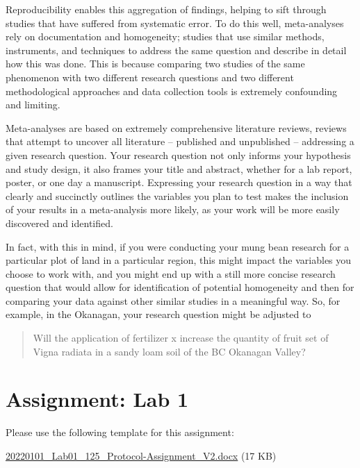 \documentclass[
]{book}
\begin{document}
Reproducibility enables this aggregation of findings, helping to sift through studies that have suffered from systematic error. To do this well, meta-analyses rely on documentation and homogeneity; studies that use similar methods, instruments, and techniques to address the same question and describe in detail how this was done. This is because comparing two studies of the same phenomenon with two different research questions and two different methodological approaches and data collection tools is extremely confounding and limiting.

Meta-analyses are based on extremely comprehensive literature reviews, reviews that attempt to uncover all literature -- published and unpublished -- addressing a given research question. Your research question not only informs your hypothesis and study design, it also frames your title and abstract, whether for a lab report, poster, or one day a manuscript. Expressing your research question in a way that clearly and succinctly outlines the variables you plan to test makes the inclusion of your results in a meta-analysis more likely, as your work will be more easily discovered and identified.

In fact, with this in mind, if you were conducting your mung bean research for a particular plot of land in a particular region, this might impact the variables you choose to work with, and you might end up with a still more concise research question that would allow for identification of potential homogeneity and then for comparing your data against other similar studies in a meaningful way. So, for example, in the Okanagan, your research question might be adjusted to

\begin{quote}
Will the application of fertilizer x increase the quantity of fruit set of Vigna radiata in a sandy loam soil of the BC Okanagan Valley?
\end{quote}

\hypertarget{assignment-lab-1}{%
\chapter*{Assignment: Lab 1}\label{assignment-lab-1}}

Please use the following template for this assignment:

\href{files/20220101_Lab01_125_Protocol-Assignment_V2.docx}{20220101\_Lab01\_125\_Protocol-Assignment\_V2.docx} (17 KB)
\end{document}
